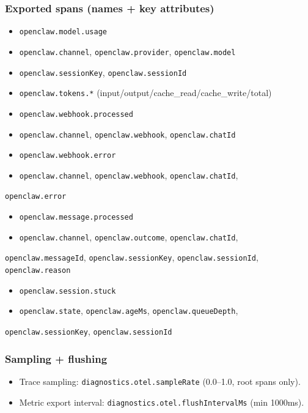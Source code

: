 \subsubsection{Exported spans (names + key attributes)}


\begin{itemize}
  \item \texttt{openclaw.model.usage}
  \item \texttt{openclaw.channel}, \texttt{openclaw.provider}, \texttt{openclaw.model}
  \item \texttt{openclaw.sessionKey}, \texttt{openclaw.sessionId}
  \item \texttt{openclaw.tokens.*} (input/output/cache\_read/cache\_write/total)
  \item \texttt{openclaw.webhook.processed}
  \item \texttt{openclaw.channel}, \texttt{openclaw.webhook}, \texttt{openclaw.chatId}
  \item \texttt{openclaw.webhook.error}
  \item \texttt{openclaw.channel}, \texttt{openclaw.webhook}, \texttt{openclaw.chatId},
\end{itemize}

\texttt{openclaw.error}
\begin{itemize}
  \item \texttt{openclaw.message.processed}
  \item \texttt{openclaw.channel}, \texttt{openclaw.outcome}, \texttt{openclaw.chatId},
\end{itemize}

\texttt{openclaw.messageId}, \texttt{openclaw.sessionKey}, \texttt{openclaw.sessionId},
\texttt{openclaw.reason}
\begin{itemize}
  \item \texttt{openclaw.session.stuck}
  \item \texttt{openclaw.state}, \texttt{openclaw.ageMs}, \texttt{openclaw.queueDepth},
\end{itemize}

\texttt{openclaw.sessionKey}, \texttt{openclaw.sessionId}

\subsubsection{Sampling + flushing}


\begin{itemize}
  \item Trace sampling: \texttt{diagnostics.otel.sampleRate} (0.0–1.0, root spans only).
  \item Metric export interval: \texttt{diagnostics.otel.flushIntervalMs} (min 1000ms).
\end{itemize}


